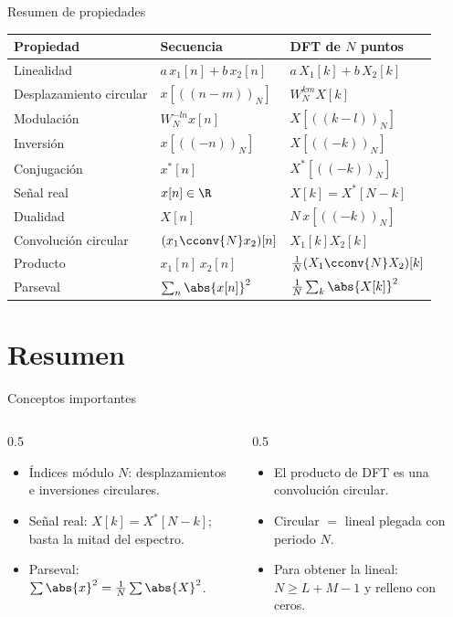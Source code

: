 \documentclass[aspectratio=169,11pt]{beamer}
\begin{document}
\begin{frame}{Resumen de propiedades}
  \footnotesize
  \renewcommand{\arraystretch}{1.25}
  \begin{center}
    \begin{tabular}{@{}lll@{}}
      \toprule
      Propiedad & Secuencia & DFT de $N$ puntos\\\midrule
      Linealidad & $a\,x_1[n]+b\,x_2[n]$ & $a\,X_1[k]+b\,X_2[k]$\\
      Desplazamiento circular & $x[((n-m))_N]$ & $W_N^{km}X[k]$\\
      Modulación & $W_N^{-ln}x[n]$ & $X[((k-l))_N]$\\
      Inversión & $x[((-n))_N]$ & $X[((-k))_N]$\\
      Conjugación & $x^*[n]$ & $X^*[((-k))_N]$\\
      Señal real & $x[n]\in\R$ & $X[k]=X^*[N-k]$\\
      Dualidad & $X[n]$ & $N\,x[((-k))_N]$\\
      Convolución circular & $(x_1\cconv{N}x_2)[n]$ & $X_1[k]X_2[k]$\\
      Producto & $x_1[n]\,x_2[n]$ & $\frac1N(X_1\cconv{N}X_2)[k]$\\
      Parseval & $\sum_n\abs{x[n]}^2$ & $\frac1N\sum_k\abs{X[k]}^2$\\\bottomrule
    \end{tabular}
  \end{center}
\end{frame}

\section*{Resumen}
\begin{frame}{Conceptos importantes}
  \begin{columns}[T]
    \begin{column}{0.5\textwidth}
      \begin{itemize}
        \item Índices módulo $N$: desplazamientos e inversiones circulares.
        \item Señal real: $X[k]=X^*[N-k]$; basta la mitad del espectro.
        \item Parseval: $\sum\abs{x}^2=\frac1N\sum\abs{X}^2$.
      \end{itemize}
    \end{column}
    \begin{column}{0.5\textwidth}
      \begin{itemize}
        \item El producto de DFT es una convolución \alert{circular}.
        \item Circular $=$ lineal plegada con periodo $N$.
        \item Para obtener la lineal: $N\ge L+M-1$ y relleno con ceros.
      \end{itemize}
    \end{column}
  \end{columns}
  \bigskip
\end{frame}
\end{document}
